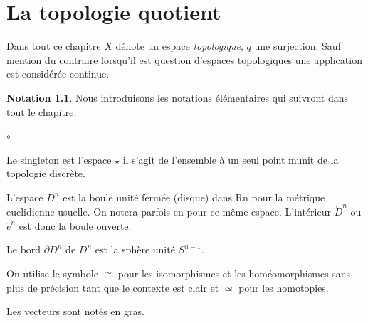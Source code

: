 \documentclass[12pt]{book}
\theoremstyle{definition}
\newtheorem*{notation}{Notation}
\theoremstyle{remark}
\begin{document}
	\chapter{La topologie quotient}
	Dans tout ce chapitre $X$ dénote un espace \emph{topologique}, $q$ une surjection. Sauf mention du contraire lorsqu'il est question d'espaces topologiques une application est considérée continue.

	\begin{notation}
		Nous introduisons les notations élémentaires qui suivront dans tout le chapitre.
		\begin{list}{$\circ$}{}
			\item Le singleton est l'espace $\star$ il s'agit de l'ensemble à un seul point munit de la topologie discrète. 
			\item L'espace $D^n$ est la boule unité fermée (disque) dans Rn pour la métrique euclidienne usuelle. On notera parfois en pour ce même espace. L'intérieur $\mathring{D}^n$ ou $\mathring{e}^n$ est donc la boule ouverte. 
			\item Le bord $\partial D^n$ de $D^n$ est la sphère unité $S^{n-1}$. 
			\item On utilise le symbole $\cong$ pour les isomorphismes et les homéomorphismes sans plus de précision tant que le contexte est clair et $\simeq$ pour les homotopies.
			\item Les vecteurs sont notés en gras.
		\end{list}
	\end{notation}
\end{document}
